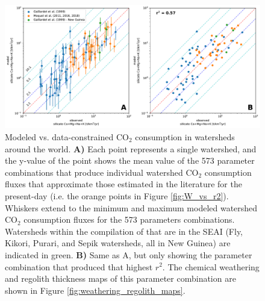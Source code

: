 \documentclass[11pt,letterpaper]{article}
\newcommand{\COtwo}{CO$_{2}$\xspace}
\begin{document}
\begin{figure}[h!]
    \centering
    \includegraphics[width=1\textwidth]{Figures/r2_cross_plot.pdf}
    \caption{Modeled vs. data-constrained \COtwo consumption in watersheds around the world. \textbf{A)} Each point represents a single watershed, and the y-value of the point shows the mean value of the 573 parameter combinations that produce individual watershed \COtwo consumption fluxes that approximate those estimated in the literature for the present-day (i.e. the orange points in Figure \ref{fig:W_vs_r2}). Whiskers extend to the minimum and maximum modeled watershed \COtwo consumption fluxes for the 573 parameters combinations. Watersheds within the compilation of \citet{Gaillardet1999a} that are in the SEAI (Fly, Kikori, Purari, and Sepik watersheds, all in New Guinea) are indicated in green. \textbf{B)} Same as A, but only showing the parameter combination that produced that highest $r^{2}$. The chemical weathering and regolith thickness maps of this parameter combination are shown in Figure \ref{fig:weathering_regolith_maps}.}
    \label{fig:r2_cross_plot}
\end{figure}
\end{document}
